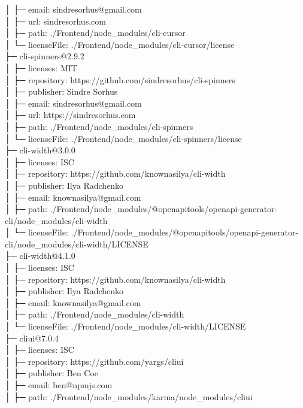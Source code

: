 │  ├─ email: sindresorhus@gmail.com\\
│  ├─ url: sindresorhus.com\\
│  ├─ path: ./Frontend/node\_modules/cli-cursor\\
│  └─ licenseFile: ./Frontend/node\_modules/cli-cursor/license\\
├─ cli-spinners@2.9.2\\
│  ├─ licenses: MIT\\
│  ├─ repository: https://github.com/sindresorhus/cli-spinners\\
│  ├─ publisher: Sindre Sorhus\\
│  ├─ email: sindresorhus@gmail.com\\
│  ├─ url: https://sindresorhus.com\\
│  ├─ path: ./Frontend/node\_modules/cli-spinners\\
│  └─ licenseFile: ./Frontend/node\_modules/cli-spinners/license\\
├─ cli-width@3.0.0\\
│  ├─ licenses: ISC\\
│  ├─ repository: https://github.com/knownasilya/cli-width\\
│  ├─ publisher: Ilya Radchenko\\
│  ├─ email: knownasilya@gmail.com\\
│  ├─ path: ./Frontend/node\_modules/@openapitools/openapi-generator-cli/node\_modules/cli-width\\
│  └─ licenseFile: ./Frontend/node\_modules/@openapitools/openapi-generator-cli/node\_modules/cli-width/LICENSE\\
├─ cli-width@4.1.0\\
│  ├─ licenses: ISC\\
│  ├─ repository: https://github.com/knownasilya/cli-width\\
│  ├─ publisher: Ilya Radchenko\\
│  ├─ email: knownasilya@gmail.com\\
│  ├─ path: ./Frontend/node\_modules/cli-width\\
│  └─ licenseFile: ./Frontend/node\_modules/cli-width/LICENSE\\
├─ cliui@7.0.4\\
│  ├─ licenses: ISC\\
│  ├─ repository: https://github.com/yargs/cliui\\
│  ├─ publisher: Ben Coe\\
│  ├─ email: ben@npmjs.com\\
│  ├─ path: ./Frontend/node\_modules/karma/node\_modules/cliui\\
